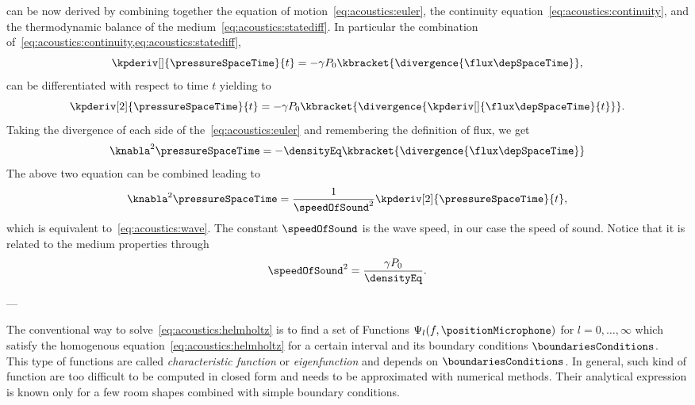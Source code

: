  can be now derived by combining together
the equation of motion~\eqref{eq:acoustics:euler},
the continuity equation~\eqref{eq:acoustics:continuity},
and the thermodynamic balance of the medium~\eqref{eq:acoustics:statediff}.
In particular the combination of~\cref{eq:acoustics:continuity,eq:acoustics:statediff},
\begin{equation}
    \kpderiv[]{\pressureSpaceTime}{t} = - \gamma P_0 \kbracket{\divergence{\flux\depSpaceTime}}
    ,
\end{equation}
can be differentiated with respect to time $t$ yielding to
\begin{equation}
    \kpderiv[2]{\pressureSpaceTime}{t} = - \gamma P_0 \kbracket{\divergence{\kpderiv[]{\flux\depSpaceTime}{t}}}
    .
\end{equation}
Taking the divergence of each side of the~\cref{eq:acoustics:euler} and remembering the definition of flux, we get
\begin{equation}
    \knabla^2 \pressureSpaceTime = -\densityEq \kbracket{\divergence{\flux\depSpaceTime}}
\end{equation}
The above two equation can be combined leading to
\begin{equation}
    \knabla^2 \pressureSpaceTime = \frac{1}{\speedOfSound^2} \kpderiv[2]{\pressureSpaceTime}{t}
    ,
\end{equation}
which is equivalent to~\cref{eq:acoustics:wave}.
The constant $\speedOfSound$ is the wave speed, in our case the speed of sound.
Notice that it is related to the medium properties through
\begin{equation}
    \speedOfSound^2 = \frac{\gamma P_0}{\densityEq}
    .
\end{equation}

---

The conventional way to solve~\cref{eq:acoustics:helmholtz} is to find a set of Functions $\Psi_l(f, \positionMicrophone)$ for $l = 0, \dots, \infty$
which satisfy the homogenous equation~\cref{eq:acoustics:helmholtz}
for a certain interval and its boundary conditions $\boundariesConditions$.
\\This type of functions are called \textit{characteristic function} or \textit{eigenfunction}
and depends on $\boundariesConditions$.
In general, such kind of function are too difficult to be computed in closed form and needs to be approximated with numerical methods.
Their analytical expression is known only for a few room shapes combined with simple boundary conditions.


